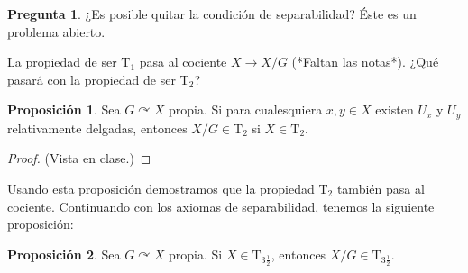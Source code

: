 \documentclass[spanish]{article}
\theoremstyle{definition}
\newtheorem*{prop}{Proposición}
\newtheorem*{pregunta}{Pregunta}
\begin{document}
\begin{pregunta}
	¿Es posible quitar la condición de separabilidad? Éste es un problema abierto.
\end{pregunta}
La propiedad de ser $\operatorname{T_1}$ pasa al cociente $X\to X/G$ (*Faltan las notas*). ¿Qué pasará con la propiedad de ser  $\operatorname{T_2}$?
\begin{prop}
	Sea $G\curvearrowright X$ propia. Si para cualesquiera $x,y\in X$ existen $U_x$ y $U_y$ relativamente delgadas, entonces $X/G\in\operatorname{T_2}$ si $X\in\operatorname{T_2}$.
\end{prop}
\begin{proof}
	(Vista en clase.)
\end{proof}
Usando esta proposición demostramos que la propiedad $\operatorname{T_2}$ también pasa al cociente. Continuando con los axiomas de separabilidad, tenemos la siguiente proposición:
\begin{prop}
	Sea $G\curvearrowright X$ propia. Si $X\in\operatorname{T_{3\frac{1}{2}}}$, entonces $X/G\in\operatorname{T_{3\frac{1}{2}}}$.
\end{prop}
\end{document}

